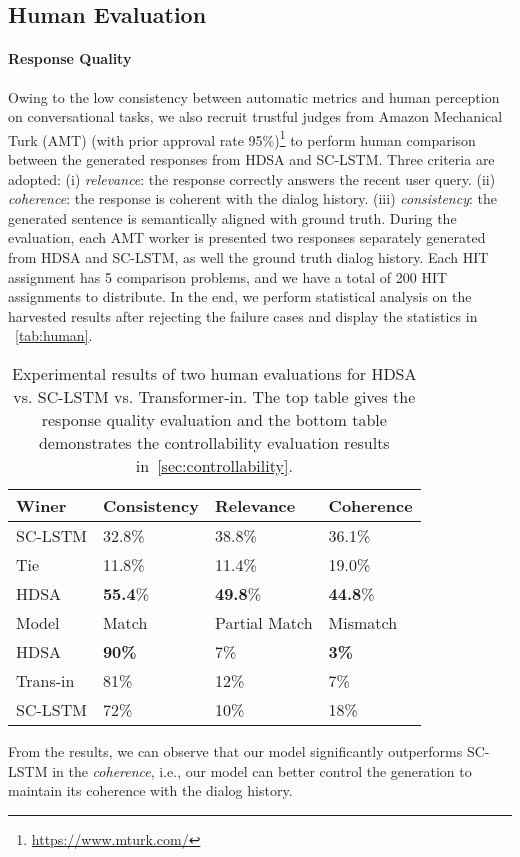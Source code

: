 \documentclass[11pt,a4paper]{article}
\begin{document}
\subsection{Human Evaluation}
\paragraph{Response Quality} Owing to the low consistency between automatic metrics and human perception on conversational tasks, we also recruit trustful judges from Amazon Mechanical Turk (AMT) (with prior approval rate 95\%)\footnote{\url{https://www.mturk.com/}} to perform human comparison between the generated responses from HDSA and SC-LSTM. Three criteria are adopted: (i) \emph{relevance}: the response correctly answers the recent user query. (ii) \emph{coherence}: the response is coherent with the dialog history. (iii) \emph{consistency}: the generated sentence is semantically aligned with ground truth. During the evaluation, each AMT worker is presented two responses separately generated from HDSA and SC-LSTM, as well the ground truth dialog history. Each HIT assignment has 5 comparison problems, and we have a total of 200 HIT assignments to distribute. In the end, we perform statistical analysis on the harvested results after rejecting the failure cases and display the statistics in ~\autoref{tab:human}. 
\begin{table}
\small
\centering
\begin{tabular}{llll} 
\toprule
Winer       & Consistency & Relevance & Coherence  \\ 
\midrule
SC-LSTM  & 32.8\%    & 38.8\%    &36.1\%    \\
Tie         & 11.8\%    & 11.4\%    & 19.0\%     \\
HDSA     & \textbf{55.4}\%    & \textbf{49.8}\%    & \textbf{44.8}\%     \\
\bottomrule
\toprule
Model            & Match & Partial Match & Mismatch  \\ 
\midrule
HDSA &    \textbf{90\%}   &     7\%    &   \textbf{3\%}  \\
Trans-in          &  81\%    &    12\%    &   7\%  \\
SC-LSTM          &  72\%    &    10\%    &   18\%  \\
\bottomrule
\end{tabular}
\caption{Experimental results of two human evaluations for HDSA vs. SC-LSTM vs. Transformer-in. The top table gives the response quality evaluation and the bottom table demonstrates the controllability evaluation results in~\autoref{sec:controllability}.}
\label{tab:human}
\vspace{-4ex}
\end{table}
From the results, we can observe that our model significantly outperforms SC-LSTM in the \emph{coherence}, i.e., our model can better control the generation to maintain its coherence with the dialog history.
\end{document}
